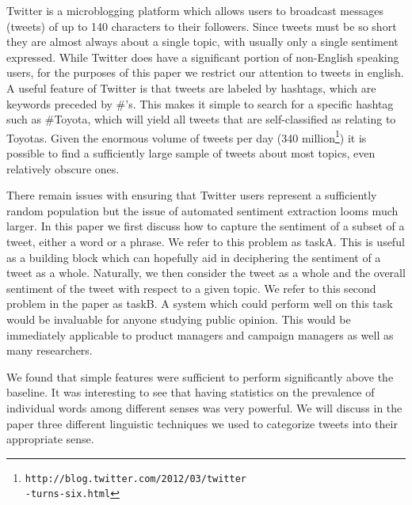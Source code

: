 \documentclass[11pt]{article}
\begin{document}
Twitter is a microblogging platform which allows users to broadcast messages (tweets) of up to 140 characters to their followers. Since tweets must be so short they are almost always about a single topic, with usually only a single sentiment expressed. While Twitter does have a significant portion of non-English speaking users, for the purposes of this paper we restrict our attention to tweets in english. A useful feature of Twitter is that tweets are labeled by hashtags, which are keywords preceded by \#'s. This makes it simple to search for a specific hashtag such as \#Toyota, which will yield all tweets that are self-classified as relating to Toyotas. Given the enormous volume of tweets per day (340 million\footnote{{\tt http://blog.twitter.com/2012/03/twitter{\\}-turns-six.html}}) it is possible to find a sufficiently large sample of tweets about most topics, even relatively obscure ones.

There remain issues with ensuring that Twitter users represent a sufficiently random population but the issue of automated sentiment extraction looms much larger. In this paper we first discuss how to capture the sentiment of a subset of a tweet, either a word or a phrase. We refer to this problem as taskA. This is useful as a building block which can hopefully aid in deciphering the sentiment of a tweet as a whole. Naturally, we then consider the tweet as a whole and the overall sentiment of the tweet with respect to a given topic. We refer to this second problem in the paper as taskB. A system which could perform well on this task would be invaluable for anyone studying public opinion. This would be immediately applicable to product managers and campaign managers as well as many researchers.

We found that simple features were sufficient to perform significantly above the baseline. It was interesting to see that having statistics on the prevalence of individual words among different senses was very powerful. We will discuss in the paper three different linguistic techniques we used to categorize tweets into their appropriate sense.
\end{document}
